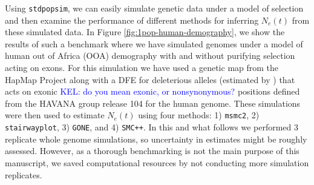 \documentclass[hidelinks]{article}
\newcommand{\stdpopsim}{\texttt{stdpopsim}\xspace}
\newcommand{\msmc}{\texttt{msmc2}\xspace}
\newcommand{\stairway}{\texttt{stairwayplot}\xspace}
\newcommand{\gone}{\texttt{GONE}\xspace}
\newcommand{\smcpp}{\texttt{SMC++}\xspace}
\newcommand{\kelcomment}[1]{\textcolor{blue}{KEL: #1}}
\begin{document}
    Using \stdpopsim, we can easily simulate genetic data under a model of selection and then 
    examine the performance of different methods for inferring $N_e(t)$ from these simulated 
    data. In Figure \ref{fig:1pop-human-demography}, we show the results of such a benchmark
    where we have simulated genomes under a model of human out of Africa (OOA) demography
    with and without purifying selection acting on exons.
    For this simulation we have used
    a genetic map from the HapMap Project \citep{international2007second} along with a
    DFE for deleterious alleles (estimated by \cite{huber2017determining})
    that acts on exonic \kelcomment{do you mean exonic, or nonsynonymous?} positions defined from the HAVANA group release 104 for the human genome.
    These simulations were then used to estimate $N_e(t)$ using four methods: 1) \msmc \citep{Schiffels2020}, 
    2) \stairway \citep{liu2020stairway}, 3) \gone \citep{santiago2020recent}, and 4) \smcpp \citep{terhorst2017robust}.
    In this and what follows we performed 3 replicate whole genome simulations, so uncertainty in estimates might
    be roughly assessed.
    However, as a thorough benchmarking is not the main purpose of this manuscript, we saved computational resources by not conducting more simulation replicates.
    
\end{document}
